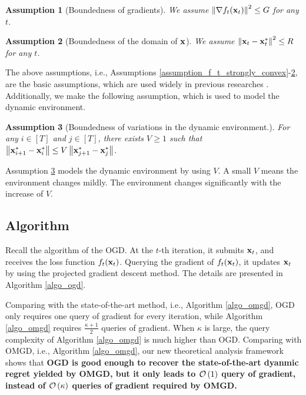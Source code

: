 \documentclass{article}
\newtheorem{Assumption}{\bf{Assumption}}
\begin{document}
\begin{Assumption}[Boundedness of gradients]
\label{assumption_bounded_gradient}
We assume  $\left\lVert\nabla f_t({\bf x}_t)\right\rVert^2 \le G$ for any $t$.
\end{Assumption}
\begin{Assumption}[Boundedness of the domain of ${\bf x}$]
\label{assumption_bounded_distance_x}
We assume  $\left\lVert{\bf x}_t - {\bf x}_t^{\ast}\right\rVert^2\le R$ for any $t$.
\end{Assumption}

The above assumptions, i.e., Assumptions \ref{assumption_f_t_strongly_convex}-\ref{assumption_bounded_distance_x}, are the basic assumptions, which are used widely in previous researches \cite{ShalevShwartz:2012dz,Hazan2016Introduction,Duchi:2011,Zinkevich:2003}. Additionally, we make the following assumption, which is used to model the dynamic environment.

\begin{Assumption}[Boundedness of variations in the dynamic environment.]
\label{assumption_bounded_variation}
For any $i\in[T]$ and $j\in[T]$,  there exists $V\ge 1$ such that $\left\lVert{\bf x}_{i+1}^{\ast} - {\bf x}_i^{\ast}\right\rVert \le V \left\lVert{\bf x}_{j+1}^{\ast} - {\bf x}_j^{\ast}\right\rVert $.
\end{Assumption} 

Assumption \ref{assumption_bounded_variation} models the dynamic environment by using $V$. A small $V$ means the environment changes mildly. The environment changes significantly with the increase of $V$. 




\subsection{Algorithm}
Recall the algorithm of the OGD. At the $t$-th iteration, it submits ${\bf x}_t$, and receives the loss function $f_t({\bf x}_t)$. Querying the gradient of $f_t({\bf x}_t)$, it updates ${\bf x}_t$ by using the projected gradient descent method. The details are presented in Algorithm \ref{algo_ogd}. 

Comparing with the state-of-the-art method, i.e., Algorithm \ref{algo_omgd}, OGD only requires one query of gradient for every iteration, while Algorithm \ref{algo_omgd} requires $\frac{\kappa + 1}{2}$ queries of gradient. When $\kappa$ is large, the query complexity of Algorithm \ref{algo_omgd} is much higher than OGD. Comparing with OMGD, i.e., Algorithm \ref{algo_omgd}, our new theoretical analysis framework shows that \textbf{OGD is good enough to recover the state-of-the-art dyanmic regret yielded by OMGD, but it only leads to ${\mathcal{O}}\left( 1 \right)$ query of gradient, instead of ${\mathcal{O}}\left( \kappa \right)$ queries of gradient required by OMGD.}
\end{document}
